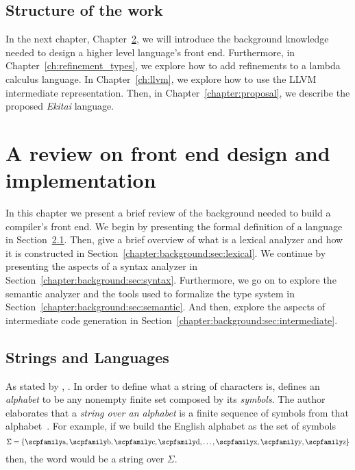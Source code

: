 \documentclass[
  oneside,
  english,
  coorientadorbanca,
  noabntexcite
]{ufsc-thesis-rn46-2019}
\newcommand{\code}[1]{\text{\scpfamily\setlength\spaceskip{0.35em}#1}}
\begin{document}
\section{Structure of the work}

In the next chapter, Chapter~\ref{chapter:background}, we will introduce the background knowledge needed to design a higher level language's front end.
Furthermore, in Chapter~\ref{ch:refinement_types}, we explore how to add refinements to a lambda calculus language.
In Chapter~\ref{ch:llvm}, we explore how to use the LLVM intermediate representation.
Then, in Chapter~\ref{chapter:proposal}, we describe the proposed \textit{Ekitai} language.

\chapter{A review on front end design and implementation}\label{chapter:background}

In this chapter we present a brief review of the background needed to build a compiler's front end.
We begin by presenting the formal definition of a language in Section~\ref{ch:background:sec:strings_and_languages}.
Then, give a brief overview of what is a lexical analyzer and how it is constructed in Section~\ref{chapter:background:sec:lexical}.
We continue by presenting the aspects of a syntax analyzer in Section~\ref{chapter:background:sec:syntax}.
Furthermore, we go on to explore the semantic analyzer and the tools used to formalize the type system in Section~\ref{chapter:background:sec:semantic}.
And then, explore the aspects of intermediate code generation in Section~\ref{chapter:background:sec:intermediate}.

\section{Strings and Languages}\label{ch:background:sec:strings_and_languages}

As stated by \textcite{sipser2012introduction}, .
In order to define what a string of characters is, \textcite{sipser2012introduction} defines an \textit{alphabet} to be any nonempty finite set composed by its \textit{symbols}.
The author elaborates that a \textit{string over an alphabet} is a finite sequence of symbols from that alphabet~\cite{sipser2012introduction}.
For example, if we build the English alphabet as the set of symbols
\begin{equation*}
  \Sigma = \{\code{a}, \code{b}, \code{c}, \code{d}, \dots, \code{x}, \code{y}, \code{z}\}
\end{equation*}
then, the word \code{compiler} would be a string over $\Sigma$.
\end{document}
